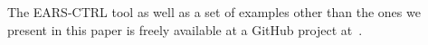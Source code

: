 The \textsf{EARS-CTRL} tool as well as a set of examples other than the ones we
present in this paper is freely available at a GitHub project
at~\cite{EARSProject}.\vspace{-.4cm}

% 


